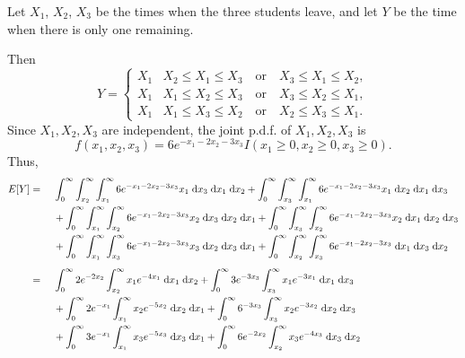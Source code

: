 \documentclass{homework}
\begin{document}
	\maketitle
	
	\question Let $X_1$, $X_2$, $X_3$ be the times when the three students leave, and let $Y$ be the time when there is only one remaining. 
	\begin{alphaparts}
		\questionpart
		Then
		\begin{equation*}
			Y = \begin{cases}
				X_1 & X_2 \le X_1 \le X_3 \quad\text{or}\quad X_3 \le X_1 \le X_2, \\
				X_1 & X_1 \le X_2 \le X_3 \quad\text{or}\quad X_3 \le X_2 \le X_1, \\
				X_1 & X_1 \le X_3 \le X_2 \quad\text{or}\quad X_2 \le X_3 \le X_1.
			\end{cases}
		\end{equation*}
		Since $X_1, X_2, X_3$ are independent, the joint p.d.f. of $X_1, X_2, X_3$ is
		\begin{equation*}
			f(x_1, x_2, x_3) = 6e^{-x_1 -2x_2 -3x_3}I(x_1\ge0, x_2\ge 0, x_3\ge0).
		\end{equation*}
		Thus,
		\begin{alignat*}{2}
		E[Y] &={}&& \int_0^\infty \int_{x_2}^\infty\int_{x_1}^\infty 6e^{-x_1-2x_2-3x_3}x_1 \dee x_3\dee x_1 \dee x_2 + \int_0^\infty \int_{x_3}^\infty\int_{x_1}^\infty 6e^{-x_1-2x_2-3x_3}x_1\dee x_2 \dee x_1 \dee x_3 \\
		&&&{}+ \int_0^\infty \int_{x_1}^\infty\int_{x_2}^\infty 6e^{-x_1-2x_2-3x_3}x_2\dee x_3\dee x_2 \dee x_1 + \int_0^\infty \int_{x_3}^\infty\int_{x_2}^\infty 6e^{-x_1-2x_2-3x_3}x_2\dee x_1 \dee x_2 \dee x_3 \\
		&&&{}+ \int_0^\infty \int_{x_1}^\infty\int_{x_3}^\infty 6e^{-x_1-2x_2-3x_3}x_3\dee x_2\dee x_3 \dee x_1 + \int_0^\infty \int_{x_2}^\infty\int_{x_3}^\infty 6e^{-x_1-2x_2-3x_3}\dee x_1 \dee x_3 \dee x_2 \\[0.5em]
		&={}&& \int_0^\infty  2e^{-2x_2} \int_{x_2}^\infty x_1 e^{-4x_1}\dee x_1 \dee x_2 + \int_0^\infty 3e^{-3x_3}\int_{x_3}^\infty x_1e^{-3x_1} \dee x_1 \dee x_3 \\
		&&&{}+ \int_0^\infty 2e^{-x_1}\int_{x_1}^\infty x_2 e^{-5x_2}\dee x_2 \dee x_1 + \int_0^\infty 6^{-3x_3}\int_{x_3}^\infty x_2e^{-3x_2}\dee x_2 \dee x_3 \\
		&&&{}+ \int_0^\infty 3e^{-x_1}\int_{x_1}^\infty x_3 e^{-5x_3}\dee x_3 \dee x_1 + \int_0^\infty 6e^{-2x_2}\int_{x_2}^\infty x_3 e^{-4x_3}\dee x_3 \dee x_2 \\[0.5em]

\end{alignat*}
\end{alphaparts}
\end{document}
